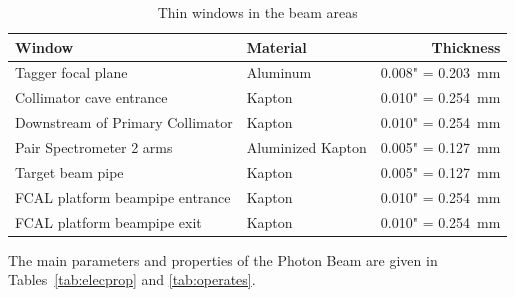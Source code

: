 \begin{table}[h]
  \begin{center}
    \caption{Thin windows in the beam areas 
       \label{tab:beam:thin-windows}
    }
    \begin{tabular}{l|l|r}
       \hline
       Window & Material & Thickness \\
       \hline
       \hline
        Tagger focal plane               & Aluminum            & 0.008" = 0.203~mm \\
        Collimator cave entrance         & Kapton              & 0.010" = 0.254~mm \\
        Downstream of Primary Collimator & Kapton              & 0.010" = 0.254~mm \\
        Pair Spectrometer 2 arms         & Aluminized Kapton   & 0.005" = 0.127~mm \\
        Target beam pipe                 &            Kapton   & 0.005" = 0.127~mm \\
        FCAL platform beampipe entrance  & Kapton              & 0.010" = 0.254~mm \\
        FCAL platform beampipe exit      & Kapton              & 0.010" = 0.254~mm \\
       \hline
    \end{tabular}
  \end{center}
\end{table}

%
%


The main parameters and properties of the Photon Beam are given in
Tables~\ref{tab:elecprop} and \ref{tab:operates}.  

